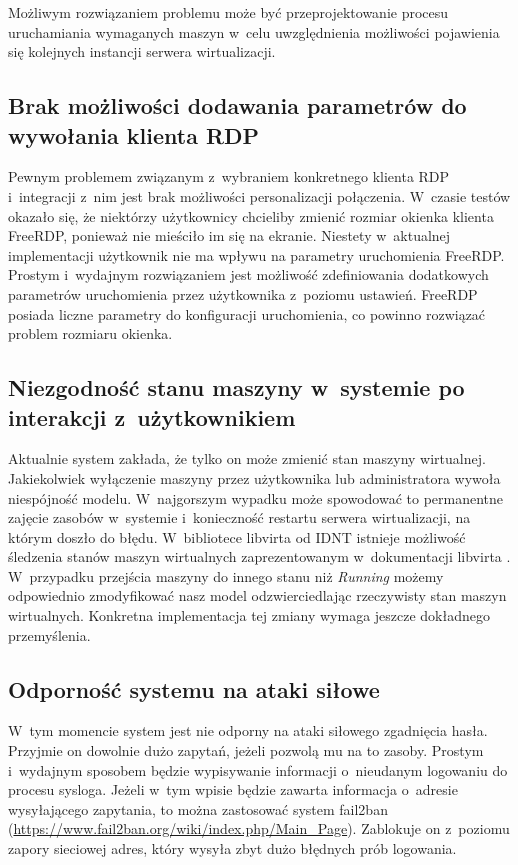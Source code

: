 \documentclass[../podsumowanie.tex]{subfiles}
\begin{document}
Możliwym rozwiązaniem problemu może być przeprojektowanie procesu uruchamiania wymaganych maszyn w~celu uwzględnienia możliwości pojawienia się kolejnych instancji serwera wirtualizacji.

\subsection{Brak możliwości dodawania parametrów do wywołania klienta RDP}

Pewnym problemem związanym z~wybraniem konkretnego klienta RDP i~integracji z~nim jest brak możliwości personalizacji połączenia.
W~czasie testów okazało się, że niektórzy użytkownicy chcieliby zmienić rozmiar okienka klienta FreeRDP, ponieważ nie mieściło im się na ekranie.
Niestety w~aktualnej implementacji użytkownik nie ma wpływu na parametry uruchomienia FreeRDP.
Prostym i~wydajnym rozwiązaniem jest możliwość zdefiniowania dodatkowych parametrów uruchomienia przez użytkownika z~poziomu ustawień.
FreeRDP posiada liczne parametry do konfiguracji \parencite{freerdp-manual} uruchomienia, co powinno rozwiązać problem rozmiaru okienka.

\subsection{Niezgodność stanu maszyny w~systemie po interakcji z~użytkownikiem}

Aktualnie system zakłada, że tylko on może zmienić stan maszyny wirtualnej.
Jakiekolwiek wyłączenie maszyny przez użytkownika lub administratora wywoła niespójność modelu.
W~najgorszym wypadku może spowodować to permanentne zajęcie zasobów w~systemie i~konieczność restartu serwera wirtualizacji, na którym doszło do błędu.
W~bibliotece libvirta od IDNT istnieje możliwość śledzenia stanów maszyn wirtualnych zaprezentowanym w~dokumentacji libvirta \parencite{libvirt-vm-states}.
W~przypadku przejścia maszyny do innego stanu niż \textit{Running} możemy odpowiednio zmodyfikować nasz model odzwierciedlając rzeczywisty stan maszyn wirtualnych.
Konkretna implementacja tej zmiany wymaga jeszcze dokładnego przemyślenia.

\subsection{Odporność systemu na ataki siłowe}

W~tym momencie system jest nie odporny na ataki siłowego zgadnięcia hasła.
Przyjmie on dowolnie dużo zapytań, jeżeli pozwolą mu na to zasoby.
Prostym i~wydajnym sposobem będzie wypisywanie informacji o~nieudanym logowaniu do procesu sysloga.
Jeżeli w~tym wpisie będzie zawarta informacja o~adresie wysyłającego zapytania, to można zastosować system fail2ban (\url{https://www.fail2ban.org/wiki/index.php/Main_Page}).
Zablokuje on z~poziomu zapory sieciowej adres, który wysyła zbyt dużo błędnych prób logowania.
\end{document}
